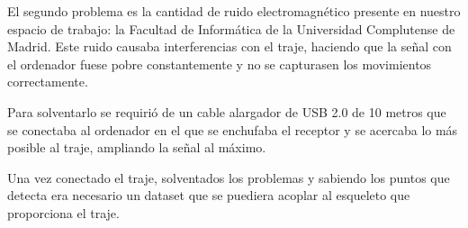 El segundo problema es la cantidad de ruido electromagnético presente en nuestro espacio de trabajo: la Facultad de Informática de la Universidad Complutense de Madrid.
Este ruido causaba interferencias con el traje, haciendo que la señal con el ordenador fuese pobre constantemente y no se capturasen los movimientos correctamente.

Para solventarlo se requirió de un cable alargador de USB 2.0 de 10 metros que se conectaba al ordenador en el que se enchufaba el receptor y se acercaba lo más posible al traje, ampliando la señal al máximo.

Una vez conectado el traje, solventados los problemas y sabiendo los puntos que detecta era necesario un dataset que se puediera acoplar al esqueleto que proporciona el traje.